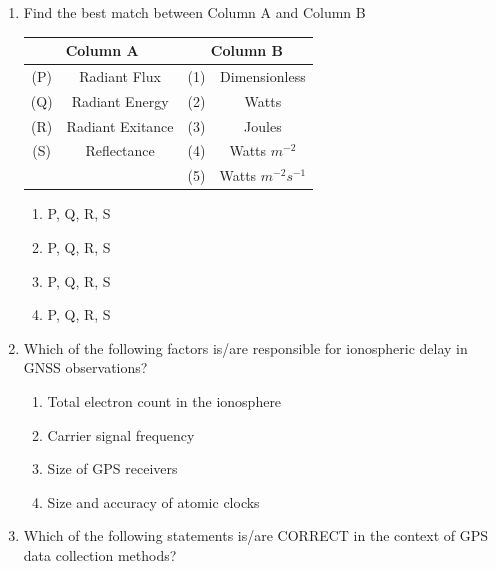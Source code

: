 \documentclass[12pt]{article}
\begin{document}
\begin{enumerate}
\item Find the best match between Column A and Column B

\begin{table}[H]
         \centering
         \begin{tabular}{|c|c|c|c|}
         \hline
              \multicolumn{2}{|c}{\textbf{Column A}}&  \multicolumn{2}{|c|}{\textbf{Column B}}\\ \hline
              (P)& Radiant Flux& (1) & Dimensionless\\ \hline
              (Q)& Radiant Energy& (2) & Watts\\ \hline
              (R)& Radiant Exitance& (3) & Joules\\ \hline
              (S)& Reflectance& (4) & Watts $m^{-2}$\\ \hline 
              \multicolumn{2}{|c|}{}& (5) & Watts $m^{-2}s^{-1}$\\ \hline
         \end{tabular}
         \label{tab:placeholder}
     \end{table}

\begin{enumerate}
    \item P, Q, R, S 
   \item P, Q, R, S 
   \item P, Q, R, S 
   \item P, Q, R, S

   
\end{enumerate}

\item Which of the following factors is/are responsible for ionospheric delay in GNSS
observations? 

\begin{enumerate}
    \item Total electron count in the ionosphere 
   \item Carrier signal frequency 
   \item Size of GPS receivers 
   \item Size and accuracy of atomic clocks
\end{enumerate}

\item Which of the following statements is/are CORRECT in the context of GPS data
collection methods?


\end{enumerate}
\end{document}
